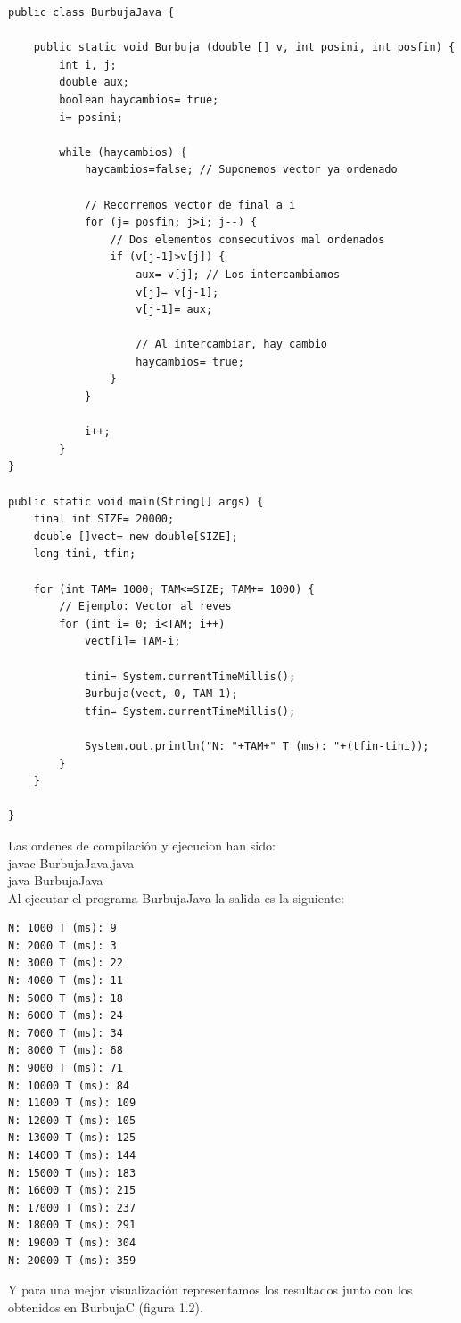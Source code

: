 	\lstset{language=C}
	\begin{lstlisting}[frame=single]
public class BurbujaJava {

	public static void Burbuja (double [] v, int posini, int posfin) {
		int i, j;
		double aux;
		boolean haycambios= true;
		i= posini;
		
		while (haycambios) {
			haycambios=false; // Suponemos vector ya ordenado
			
			// Recorremos vector de final a i
			for (j= posfin; j>i; j--) {
				// Dos elementos consecutivos mal ordenados
				if (v[j-1]>v[j]) {
					aux= v[j]; // Los intercambiamos
					v[j]= v[j-1];
					v[j-1]= aux;
					
					// Al intercambiar, hay cambio
					haycambios= true;
				}
			}
			
			i++;
		}
}

public static void main(String[] args) {
	final int SIZE= 20000;
	double []vect= new double[SIZE];
	long tini, tfin;
	
	for (int TAM= 1000; TAM<=SIZE; TAM+= 1000) {
		// Ejemplo: Vector al reves
		for (int i= 0; i<TAM; i++) 
			vect[i]= TAM-i;
			
			tini= System.currentTimeMillis();
			Burbuja(vect, 0, TAM-1);
			tfin= System.currentTimeMillis(); 
			
			System.out.println("N: "+TAM+" T (ms): "+(tfin-tini));
		}
	}

}
	\end{lstlisting} 
	
	Las ordenes de compilación y ejecucion han sido:\\
	
	javac BurbujaJava.java\\
	java BurbujaJava\\
	
	Al ejecutar el programa BurbujaJava la salida es la siguiente:
	
	\lstset{language=C}
	\begin{lstlisting}[frame=single]
N: 1000 T (ms): 9
N: 2000 T (ms): 3
N: 3000 T (ms): 22
N: 4000 T (ms): 11
N: 5000 T (ms): 18
N: 6000 T (ms): 24
N: 7000 T (ms): 34
N: 8000 T (ms): 68
N: 9000 T (ms): 71
N: 10000 T (ms): 84
N: 11000 T (ms): 109
N: 12000 T (ms): 105
N: 13000 T (ms): 125
N: 14000 T (ms): 144
N: 15000 T (ms): 183
N: 16000 T (ms): 215
N: 17000 T (ms): 237
N: 18000 T (ms): 291
N: 19000 T (ms): 304
N: 20000 T (ms): 359
	\end{lstlisting} 
	
	Y para una mejor visualización representamos los resultados junto con los obtenidos en BurbujaC (figura 1.2).
	
